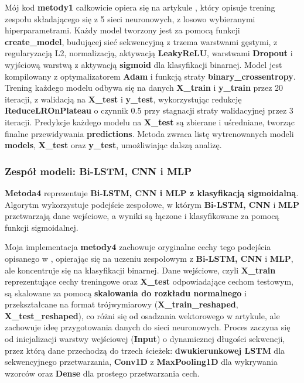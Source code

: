 Mój kod \textbf{metody1} całkowicie opiera się na artykule \cite{metoda1}, który opisuje trening zespołu składającego się z 5 sieci neuronowych, z losowo wybieranymi hiperparametrami. Każdy model tworzony jest za pomocą funkcji \textbf{create\_model}, budującej sieć sekwencyjną z trzema warstwami gęstymi, z regularyzacją L2, normalizacją, aktywacją \textbf{LeakyReLU}, warstwami \textbf{Dropout} i wyjściową warstwą z aktywacją \textbf{sigmoid} dla klasyfikacji binarnej. Model jest kompilowany z optymalizatorem \textbf{Adam} i funkcją straty \textbf{binary\_crossentropy}. Trening każdego modelu odbywa się na danych \textbf{X\_train} i \textbf{y\_train} przez 20 iteracji, z walidacją na \textbf{X\_test} i \textbf{y\_test}, wykorzystując redukcję \textbf{ReduceLROnPlateau} o czynnik 0.5 przy stagnacji straty walidacyjnej przez 3 iteracji. Predykcje każdego modelu na \textbf{X\_test} są zbierane i uśredniane, tworząc finalne przewidywania \textbf{predictions}. Metoda zwraca listę wytrenowanych modeli \textbf{models}, \textbf{X\_test} oraz \textbf{y\_test}, umożliwiając dalszą analizę.

\subsubsection{Zespół modeli: Bi-LSTM, CNN i MLP}
\textbf{Metoda4} reprezentuje \textbf{Bi-LSTM, CNN i MLP z klasyfikacją sigmoidalną}. Algorytm wykorzystuje podejście zespołowe, w którym \textbf{Bi-LSTM, CNN} i \textbf{MLP} przetwarzają dane wejściowe, a wyniki są łączone i klasyfikowane za pomocą funkcji sigmoidalnej.

Moja implementacja \textbf{metody4} zachowuje oryginalne cechy tego podejścia opisanego w \cite{metoda4}, opierając się na uczeniu zespołowym z \textbf{Bi-LSTM, CNN} i \textbf{MLP}, ale koncentruje się na klasyfikacji binarnej. Dane wejściowe, czyli \textbf{X\_train} reprezentujące cechy treningowe oraz \textbf{X\_test} odpowiadające cechom testowym, są skalowane za pomocą \textbf{skalowania do rozkładu normalnego} i przekształcane na format trójwymiarowy (\textbf{X\_train\_reshaped}, \textbf{X\_test\_reshaped}), co różni się od osadzania wektorowego w artykule, ale zachowuje ideę przygotowania danych do sieci neuronowych. Proces zaczyna się od inicjalizacji warstwy wejściowej (\textbf{Input}) o dynamicznej długości sekwencji, przez którą dane przechodzą do trzech ścieżek: \textbf{dwukierunkowej LSTM} dla sekwencyjnego przetwarzania, \textbf{Conv1D} z \textbf{MaxPooling1D} dla wykrywania wzorców oraz \textbf{Dense} dla prostego przetwarzania cech.

